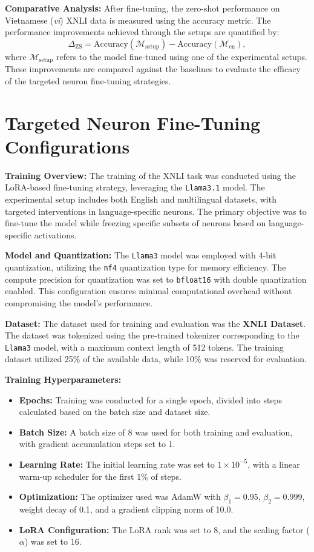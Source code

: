\textbf{Comparative Analysis:} After fine-tuning, the zero-shot performance on Vietnamese (\textit{vi}) XNLI data is measured using the accuracy metric. The performance improvements achieved through the setups are quantified by:
\begin{equation}
	\Delta_\text{ZS} = \text{Accuracy}(\mathcal{M}_\text{setup}) - \text{Accuracy}(\mathcal{M}_\text{en}),
\end{equation}
where \(\mathcal{M}_\text{setup}\) refers to the model fine-tuned using one of the experimental setups. These improvements are compared against the baselines to evaluate the efficacy of the targeted neuron fine-tuning strategies.

\section{Targeted Neuron Fine-Tuning Configurations}

\textbf{Training Overview:} The training of the XNLI task was conducted using the LoRA-based fine-tuning strategy, leveraging the \texttt{Llama3.1} model. The experimental setup includes both English and multilingual datasets, with targeted interventions in language-specific neurons. The primary objective was to fine-tune the model while freezing specific subsets of neurons based on language-specific activations. 

\textbf{Model and Quantization:} The \texttt{Llama3} model was employed with 4-bit quantization, utilizing the \texttt{nf4} quantization type for memory efficiency. The compute precision for quantization was set to \texttt{bfloat16} with double quantization enabled. This configuration ensures minimal computational overhead without compromising the model's performance.

\textbf{Dataset:} 
The dataset used for training and evaluation was the \textbf{XNLI Dataset}. The dataset was tokenized using the pre-trained tokenizer corresponding to the \texttt{Llama3} model, with a maximum context length of 512 tokens. The training dataset utilized 25\% of the available data, while 10\% was reserved for evaluation. 

\textbf{Training Hyperparameters:}
\begin{itemize}
	\item \textbf{Epochs:} Training was conducted for a single epoch, divided into steps calculated based on the batch size and dataset size.
	\item \textbf{Batch Size:} A batch size of 8 was used for both training and evaluation, with gradient accumulation steps set to 1.
	\item \textbf{Learning Rate:} The initial learning rate was set to \(1 \times 10^{-5}\), with a linear warm-up scheduler for the first 1\% of steps.
	\item \textbf{Optimization:} The optimizer used was AdamW with \(\beta_1 = 0.95\), \(\beta_2 = 0.999\), weight decay of 0.1, and a gradient clipping norm of 10.0.
	\item \textbf{LoRA Configuration:} The LoRA rank was set to 8, and the scaling factor (\(\alpha\)) was set to 16.
\end{itemize}



